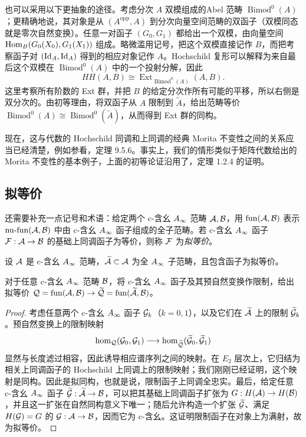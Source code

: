 \begin{note}\label{st:2.7}
也可以采用以下更抽象的途径。考虑分次 $A$ 双模组成的Abel 范畴 $\operatorname{Bimod}^0(A)$；更精确地说，其对象是从 $(A^{\mathrm{opp}},A)$ 到分次向量空间范畴的双函子（双模同态就是零次自然变换）。任意一对函子 $(G_0,G_1)$ 都给出一个双模，由向量空间 $\operatorname{Hom}_B(G_0(X_0),G_1(X_1))$ 组成。略微滥用记号，把这个双模直接记作 $B$，而把考察函子对 $(\operatorname{Id}_A,\operatorname{Id}_A)$ 得到的相应对象记作 $A$。Hochschild 复形可以解释为来自最后这个双模在 $\operatorname{Bimod}^0(A)$ 中的一个投射分解，因此
\begin{equation}\label{eq:2.8}
HH(A,B)\cong\operatorname{Ext}_{\operatorname{Bimod}^0(A)}(A,B).
\end{equation}
这里考察所有阶数的 Ext 群，并把 $B$ 的给定分次作所有可能的平移，所以右侧是双分次的。由初等理由，将双函子从 $A$ 限制到 $\widetilde A$，给出范畴等价 $\operatorname{Bimod}^0(A)\cong\operatorname{Bimod}^0(\widetilde A)$，从而得到 Ext 群的同构。

现在，这与代数的 Hochschild 同调和上同调的经典 Morita 不变性之间的关系应当已经清楚，例如参看，定理 9.5.6。事实上，我们的情形类似于矩阵代数给出的 Morita 不变性的基本例子，上面的初等论证沿用了，定理 1.2.4 的证明。
\end{note}

\subsection{拟等价}\label{sec:2e}
\begin{definition*}
还需要补充一点记号和术语：给定两个 c-含幺 $A_\infty$ 范畴 $\mathcal A,\mathcal B$，用 $\operatorname{fun}(\mathcal A,\mathcal B)$ 表示 $\operatorname{nu\text{-}fun}(\mathcal A,\mathcal B)$ 中由 c-含幺 $A_\infty$ 函子组成的全子范畴。若 c-含幺 $A_\infty$ 函子 $\mathcal F:\mathcal A\to\mathcal B$ 的基础上同调函子为等价，则称 $\mathcal F$ 为\emph{拟等价}。
\end{definition*}

设 $\mathcal A$ 是 c-含幺 $A_\infty$ 范畴，$\widetilde{\mathcal A}\subset\mathcal A$ 为全 $A_\infty$ 子范畴，且包含函子为拟等价。
\begin{lemma}\label{st:2.8}
对于任意 c-含幺 $A_\infty$ 范畴 $\mathcal B$，将 c-含幺 $A_\infty$ 函子及其预自然变换作限制，给出拟等价 $\mathcal Q=\operatorname{fun}(\mathcal A,\mathcal B)\to\widetilde{\mathcal Q}=\operatorname{fun}(\widetilde{\mathcal A},\mathcal B)$。
\end{lemma}
\begin{proof}
考虑任意两个 c-含幺 $A_\infty$ 函子 $\mathcal G_k$（$k=0,1$），以及它们在 $\widetilde{\mathcal A}$ 上的限制 $\widetilde{\mathcal G}_k$。预自然变换上的限制映射
\begin{equation}\label{eq:2.9}
\hom_{\mathcal Q}(\mathcal G_0,\mathcal G_1)\longrightarrow\hom_{\widetilde{\mathcal Q}}(\widetilde{\mathcal G}_0,\widetilde{\mathcal G}_1)
\end{equation}
显然与长度滤过相容，因此诱导相应谱序列之间的映射。在 $E_2$ 层次上，它归结为相关上同调函子的 Hochschild 上同调上的限制映射；我们刚刚已经证明，这个映射是同构。因此是拟同构，也就是说，限制函子上同调全忠实。最后，给定任意 c-含幺 $A_\infty$ 函子 $\widetilde{\mathcal G}:\widetilde{\mathcal A}\to\mathcal B$，可以把其基础上同调函子扩张为 $G:H(\mathcal A)\to H(\mathcal B)$，并且这一扩张在自然同构意义下唯一；随后允许构造一个扩张 $\widetilde{\mathcal G}$、满足 $H(\mathcal G)=G$ 的 $\mathcal G:\mathcal A\to\mathcal B$，因而它为 c-含幺。这证明限制函子在对象上为满射，故为拟等价。
\end{proof}

